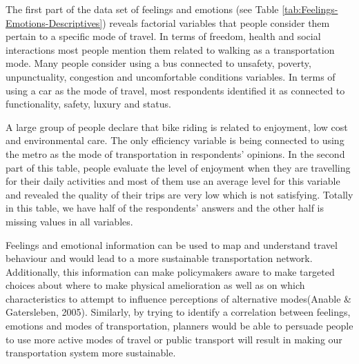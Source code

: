 \documentclass[
11pt, %
oneside, %
english, %
singlespacing, %
]{macthesis} %
\begin{document}
The first part of the data set of feelings and emotions (see Table \ref{tab:Feelings-Emotions-Descriptives}) reveals factorial variables that people consider them pertain to a specific mode of travel. In terms of freedom, health and social interactions most people mention them related to walking as a transportation mode. Many people consider using a bus connected to unsafety, poverty, unpunctuality, congestion and uncomfortable conditions variables. In terms of using a car as the mode of travel, most respondents identified it as connected to functionality, safety, luxury and status.

A large group of people declare that bike riding is related to enjoyment, low cost and environmental care. The only efficiency variable is being connected to using the metro as the mode of transportation in respondents' opinions. In the second part of this table, people evaluate the level of enjoyment when they are travelling for their daily activities and most of them use an average level for this variable and revealed the quality of their trips are very low which is not satisfying. Totally in this table, we have half of the respondents' answers and the other half is missing values in all variables.

Feelings and emotional information can be used to map and understand travel behaviour and would lead to a more sustainable transportation network. Additionally, this information can make policymakers aware to make targeted choices about where to make physical amelioration as well as on which characteristics to attempt to influence perceptions of alternative modes(Anable \& Gatersleben, 2005). Similarly, by trying to identify a correlation between feelings, emotions and modes of transportation, planners would be able to persuade people to use more active modes of travel or public transport will result in making our transportation system more sustainable.
\end{document}
